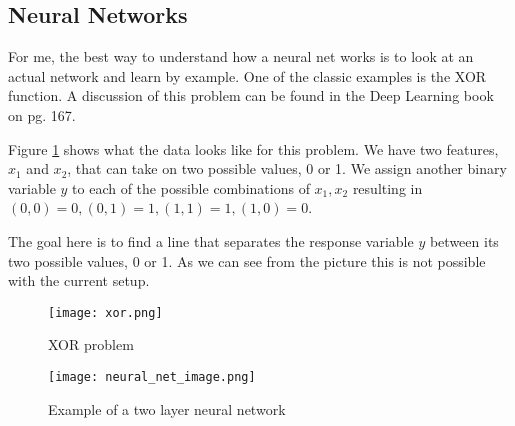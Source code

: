 \subsection{Neural Networks}

For me, the best way to understand how a neural net works is to look at an actual network and learn by example. One of the classic examples is the XOR function. A discussion of this problem can be found in the Deep Learning book on pg. 167.

Figure \ref{fig:xor} shows what the data looks like for this problem. We have two features, $x_1$ and $x_2$, that can take on two possible values, 0 or 1. We assign another binary variable $y$ to each of the possible combinations of $x_1, x_2$ resulting in $(0,0) = 0, (0,1)=1, (1,1)=1, (1,0)=0$.

The goal here is to find a line that separates the response variable $y$ between its two possible values, 0 or 1. As we can see from the picture this is not possible with the current setup.

 \begin{figure} \label{fig:xor}
\caption{XOR problem}
\centering
 \texttt{[image: xor.png]}
 \end{figure}
 
 
 
 \begin{figure} \label{fig:neural_net_image}
\caption{Example of a two layer neural network}
\centering
 \texttt{[image: neural\_net\_image.png]}
 \end{figure}